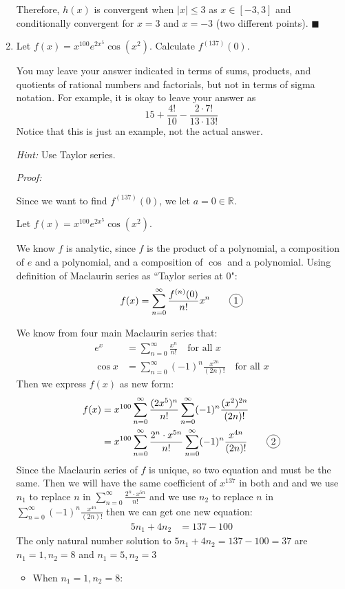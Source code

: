 \documentclass[12pt]{exam}
\newcommand {\DS} [1] {${\displaystyle #1}$}
\newcommand{\R}{\mathbb{R}}
\newcommand*\circled[1]{\tikz[baseline=(char.base)]{
            \node[shape=circle,draw,inner sep=2pt] (char) {#1};}}
\begin{document}
\begin{enumerate}
Therefore, $h(x)$ is convergent when $|x| \leq 3$ as $x\in[-3,3]$ and conditionally convergent for $x=3$ and $x=-3$ (two different points). $\blacksquare$

\newpage

\item Let \DS{f(x) = x^{100} e^{2x^5} \cos ( x^2) }.  Calculate \DS{f^{(137)}(0)}.   

You may leave your answer indicated in terms of sums, products, and quotients of rational numbers and factorials, but not in terms of sigma notation.  For example, it is okay to leave your answer as
	$$
		 15 + \frac{4!}{10} - \frac{2 \cdot 7!}{13 \cdot 13!}
	$$ 
Notice that this is just an example, not the actual answer.	

\emph{Hint:}  Use Taylor series.  

\emph{Proof:}

Since we want to find $f^{(137)}(0)$, we let $a=0\in\R$.

Let $f(x) = x^{100} e^{2x^5} \cos ( x^2)$.

We know $f$ is analytic, since $f$ is the product of a polynomial, a composition of $e$ and a polynomial, and a composition of $\cos$ and a polynomial. Using definition of Maclaurin series as ``Taylor series at $0$":
$$
    f(x)=\sum_{n=0}^\infty \frac{f^{(n)}(0)}{n!}x^n \qquad\circled{1}
$$

We know from four main Maclaurin series that:
\begin{align*}
    e^x &= \sum_{n=0}^\infty \frac{x^n}{n!}\quad\mbox{for all }x\\
    \cos x &= \sum_{n=0}^\infty  (-1)^n\frac{x^{2n}}{(2n)!}\quad\mbox{for all }x
\end{align*}
Then we express $f(x)$ as new form:
\begin{align*}
    f(x) &= x^{100}\sum_{n=0}^\infty \frac{(2x^5)^n}{n!}\sum_{n=0}^\infty  (-1)^n\frac{(x^2)^{2n}}{(2n)!} \\
    &= x^{100}\sum_{n=0}^\infty \frac{2^n\cdot x^{5n}}{n!}\sum_{n=0}^\infty  (-1)^n\frac{x^{4n}}{(2n)!} \qquad\circled{2}
\end{align*}
Since the Maclaurin series of $f$ is unique, so two equation \circled{1} and \circled{2} must be the same. Then we will have the same coefficient of $x^{137}$ in both \circled{1} and \circled{2} and we use $n_1$ to replace $n$ in $\sum_{n=0}^\infty \frac{2^n\cdot x^{5n}}{n!}$ and we use $n_2$ to replace $n$ in $\sum_{n=0}^\infty  (-1)^n\frac{x^{4n}}{(2n)!}$ then we can get one new equation:
\begin{align*}
    5n_1+4n_2&=137-100
\end{align*}
The only natural number solution to $5n_1+4n_2=137-100=37$ are $n_1=1,n_2=8$ and $n_1=5,n_2=3$
\begin{itemize}
    \item When $n_1=1,n_2=8$:
    

\end{itemize}
\end{enumerate}
\end{document}
